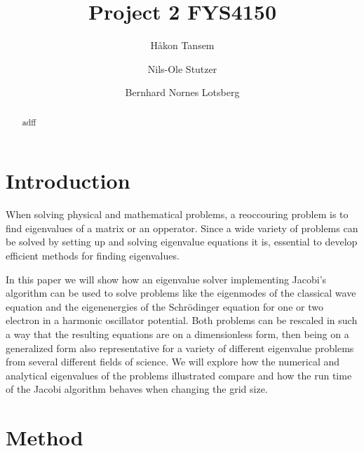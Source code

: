 \documentclass[twocolumn]{aastex62}
\begin{document}
\title{Project 2 FYS4150}




\author{Håkon Tansem}

\author{Nils-Ole Stutzer}

\author{Bernhard Nornes Lotsberg}

\begin{abstract}
adff
\end{abstract}

\section{Introduction} \label{sec:intro}
When solving physical and mathematical problems, a reoccouring problem is to
find eigenvalues of a matrix or an opperator. Since a wide variety of problems
can be solved by setting up and solving eigenvalue equations it is, essential to
develop efficient methods for finding eigenvalues. 

In this paper we will show how an eigenvalue solver implementing Jacobi's
algorithm can be used to solve problems like the eigenmodes of the classical
wave equation and the eigenenergies of the Schrödinger equation for one or two
electron in a harmonic oscillator potential. Both problems can be rescaled in
such a way that the resulting equations are on a dimensionless form, then being
on a generalized form also representative for a variety of different eigenvalue
problems from several different fields of science. We will explore how the
numerical and analytical eigenvalues of the problems illustrated compare and how
the run time of the Jacobi algorithm behaves when changing the grid size.   

\section{Method} \label{sec:method}
\end{document}

